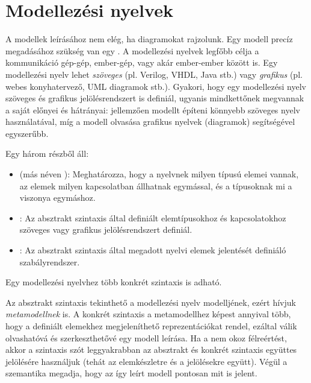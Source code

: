 
\section{Modellezési nyelvek}

A modellek leírásához nem elég, ha diagramokat rajzolunk. Egy modell precíz megadásához szükség van egy . A modellezési nyelvek legfőbb célja a kommunikáció gép-gép, ember-gép, vagy akár ember-ember között is. Egy modellezési nyelv lehet \emph{szöveges} (pl. Verilog, VHDL, Java stb.) vagy \emph{grafikus} (pl. webes konyhatervező, UML diagramok stb.). Gyakori, hogy egy modellezési nyelv szöveges és grafikus jelölésrendszert is definiál, ugyanis mindkettőnek megvannak a saját előnyei és hátrányai: jellemzően modellt építeni könnyebb szöveges nyelv használatával, míg a modell olvasása grafikus nyelvek (diagramok) segítségével egyszerűbb.

\begin{definicio}
	Egy  három részből áll:
	\begin{itemize}
		\item {} (más néven ): Meghatározza, hogy a nyelvnek milyen típusú elemei vannak, az elemek milyen kapcsolatban állhatnak egymással, és a típusoknak mi a viszonya egymáshoz.
		\item {}: Az absztrakt szintaxis által definiált elemtípusokhoz és kapcsolatokhoz szöveges vagy grafikus jelölésrendszert definiál.
		\item {}: Az absztrakt szintaxis által megadott nyelvi elemek jelentését definiáló szabályrendszer.
	\end{itemize}
	Egy modellezési nyelvhez több konkrét szintaxis is adható.
\end{definicio}

Az absztrakt szintaxis tekinthető a modellezési nyelv modelljének, ezért hívjuk \emph{metamodellnek} is. A konkrét szintaxis a metamodellhez képest annyival több, hogy a definiált elemekhez megjeleníthető reprezentációkat rendel, ezáltal válik olvashatóvá és szerkeszthetővé egy modell leírása. Ha a nem okoz félreértést, akkor a szintaxis szót leggyakrabban az absztrakt és konkrét szintaxis együttes jelölésére használjuk (tehát az elemkészletre és a jelölésekre együtt). Végül a szemantika megadja, hogy az így leírt modell pontosan mit is jelent. 

